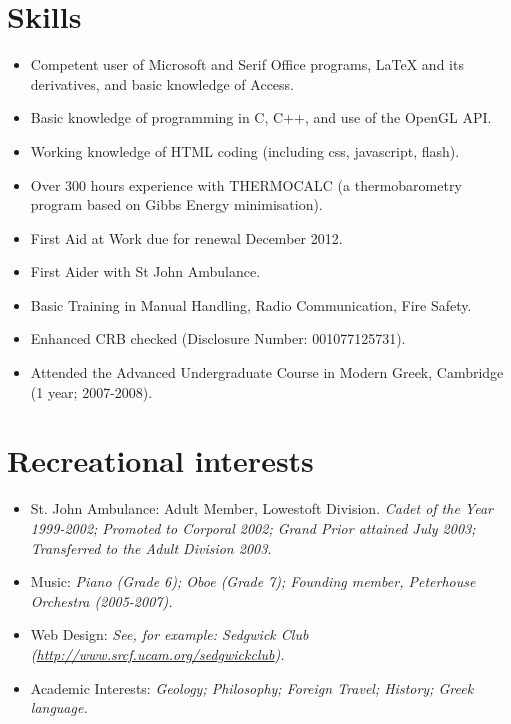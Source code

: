 \documentclass[10pt,a4paper]{article}
\begin{document}
\section*{Skills}
\begin{itemize}
\item Competent user of Microsoft and Serif Office programs, LaTeX and its derivatives, and basic knowledge of Access.
\item Basic knowledge of programming in C, C++, and use of the OpenGL API.
\item Working knowledge of HTML coding (including css, javascript, flash).
\item Over 300 hours experience with THERMOCALC (a thermobarometry program based on Gibbs Energy minimisation).
\item First Aid at Work due for renewal December 2012.
\item First Aider with St John Ambulance.
\item Basic Training in Manual Handling, Radio Communication, Fire Safety.
\item Enhanced CRB checked (Disclosure Number: 001077125731).
\item Attended the Advanced Undergraduate Course in Modern Greek, Cambridge (1 year; 2007-2008).
\end{itemize}

\vfill

\section*{Recreational interests}
\begin{itemize}
\item St. John Ambulance: Adult Member, Lowestoft Division. \emph{Cadet of the Year 1999-2002; Promoted to Corporal 2002; Grand Prior attained July 2003; Transferred to the Adult Division 2003.}
\item Music: \emph{Piano (Grade 6); Oboe (Grade 7); Founding member, Peterhouse Orchestra (2005-2007).}
\item Web Design: \emph{See, for example: Sedgwick Club (\href{http://www.srcf.ucam.org/sedgwickclub}{http://www.srcf.ucam.org/sedgwickclub}).}
\item Academic Interests: \emph{Geology; Philosophy; Foreign Travel; History; Greek language.}
\end{itemize}
\end{document}
